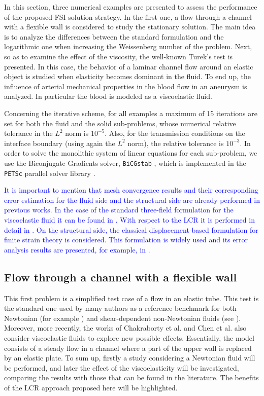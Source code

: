 \documentclass[11pt,english]{article}
\begin{document}
In this section, three numerical examples are presented to assess the performance of the proposed FSI solution strategy. In the first one, a flow through a channel with a flexible wall is considered to study the stationary solution. The main idea is to analyze the differences between the standard formulation and the logarithmic one when increasing the Weissenberg number of the problem. Next, so as to examine the effect of the viscosity, the well-known Turek's test \cite{turektest} is presented. In this case, the behavior of a laminar channel flow around an elastic object is studied when elasticity becomes dominant in the fluid. To end up, the influence of arterial mechanical properties in the blood flow in an aneurysm is analyzed. In particular the blood is modeled as a viscoelastic fluid.

Concerning the iterative scheme, for all examples a maximum of 15 iterations are set for both the fluid and the solid sub-problems, whose numerical relative tolerance in the $L^2$ norm is $10^{-5}$. Also, for the transmission conditions on the interface boundary (using again the $L^2$ norm), the relative tolerance is $10^{-3}$. In order to solve the monolithic system of linear equations for each sub-problem, we use the Biconjugate Gradients solver, \texttt{BiCGstab} \cite{BiconjugateGradientSolver}, which is implemented in the \texttt{PETSc} parallel solver library \cite{PETScHomePage}.

\textcolor{blue}{It is important to mention that mesh convergence results and their corresponding error estimation for the fluid side and the structural side are already performed in previous works. In the case of the standard three-field formulation for the viscoelastic fluid it can be found in \cite{castillo2014}. With respect to the LCR it is performed in detail in \cite{moreno2019logarithmic}. On the structural side, the classical displacement-based formulation for finite strain theory is considered. This formulation is widely used and its error analysis results are presented, for example, in \cite{Bonet}.} 

\subsection{Flow through a channel with a flexible wall\label{subsec:membrane}}

This first problem is a simplified test case of a flow in an elastic tube. This test is the standard one used by many authors as a reference benchmark for both Newtonian (for example \cite{luo1995numerical,luo1996numerical}) and shear-dependent non-Newtonian fluids (see \cite{lukavcova2008numerical,lukavcova2013kinematic}). Moreover, more recently, the works of Chakraborty et al. \cite{chakraborty2012fluid}  and Chen et al. \cite{Chen2014numerical} also consider viscoelastic fluids to explore new possible effects.
Essentially, the model consists of a steady flow in a channel where a part of the upper wall is replaced by an elastic plate. To sum up, firstly a study considering a Newtonian fluid will be performed, and later the effect of the viscoelasticity will be investigated, comparing the results with those that can be found in the literature. The benefits of the LCR approach proposed here will be highlighted.
\end{document}
